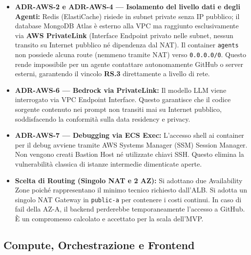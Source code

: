 \documentclass[11pt,a4paper]{article}
\begin{document}
\begin{itemize}
    \item \textbf{ADR-AWS-2 e ADR-AWS-4 --- Isolamento del livello dati e degli Agenti:} Redis (ElastiCache) risiede in subnet private senza IP pubblico; il database MongoDB Atlas è esterno alla VPC ma raggiunto esclusivamente via \textbf{AWS PrivateLink} (Interface Endpoint privato nelle subnet, nessun transito su Internet pubblico né dipendenza dal NAT). Il container \texttt{agents} non possiede alcuna route (nemmeno tramite NAT) verso \texttt{0.0.0.0/0}. Questo rende impossibile per un agente contattare autonomamente GitHub o server esterni, garantendo il vincolo \textbf{RS.3} direttamente a livello di rete.
    \item \textbf{ADR-AWS-6 --- Bedrock via PrivateLink:} Il modello LLM viene interrogato via VPC Endpoint Interface. Questo garantisce che il codice sorgente contenuto nei prompt non transiti mai su Internet pubblico, soddisfacendo la conformità sulla data residency e privacy.
    \item \textbf{ADR-AWS-7 --- Debugging via ECS Exec:} L'accesso shell ai container per il debug avviene tramite AWS Systems Manager (SSM) Session Manager. Non vengono creati Bastion Host né utilizzate chiavi SSH. Questo elimina la vulnerabilità classica di istanze intermedie dimenticate aperte.
    \item \textbf{Scelta di Routing (Singolo NAT e 2 AZ):} Si adottano due Availability Zone poiché rappresentano il minimo tecnico richiesto dall'ALB. Si adotta un singolo NAT Gateway in \texttt{public-a} per contenere i costi continui. In caso di fail della AZ-A, il backend perderebbe temporaneamente l'accesso a GitHub. È un compromesso calcolato e accettato per la scala dell'MVP.
\end{itemize}

\subsection{Compute, Orchestrazione e Frontend}
\end{document}
